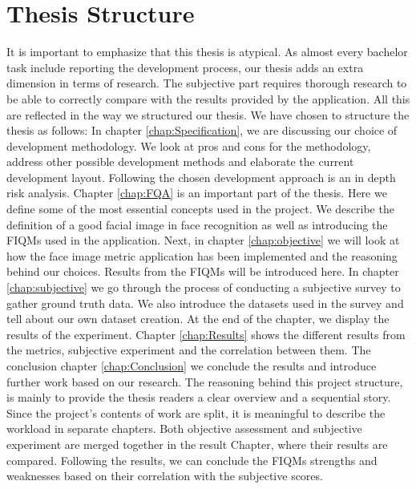 \section{Thesis Structure}
It is important to emphasize that this thesis is atypical. As almost every bachelor task include reporting the development process, our thesis adds an extra dimension in terms of research. The subjective part requires thorough research to be able to correctly compare with the results provided by the application. All this are reflected in the way we structured our thesis. 
We have chosen to structure the thesis as follows: In chapter \ref{chap:Specification}, we are discussing our choice of development methodology. We look at pros and cons for the methodology, address other possible development methods and elaborate the current development layout. Following the chosen development approach is an in depth risk analysis. Chapter \ref{chap:FQA} is an important part of the thesis. Here we define some of the most essential concepts used in the project. We describe the definition of a good facial image in face recognition as well as introducing the FIQMs used in the application. Next, in chapter \ref{chap:objective} we will look at how the face image metric application has been implemented and the reasoning behind our choices. Results from the FIQMs will be introduced here. In chapter \ref{chap:subjective} we go through the process of conducting a subjective survey to gather ground truth data. We also introduce the datasets used in the survey and tell about our own dataset creation. At the end of the chapter, we display the results of the experiment. 
Chapter \ref{chap:Results} shows the different results from the metrics, subjective experiment and the correlation between them. The conclusion chapter \ref{chap:Conclusion} we conclude the results and introduce further work based on our research. 
The reasoning behind this project structure, is mainly to provide the thesis readers a clear overview and a sequential story. Since the project's contents of work are split, it is meaningful to describe the workload in separate chapters. Both objective assessment and subjective experiment are merged together in the result Chapter, where their results are compared. Following the results, we can conclude the FIQMs strengths and weaknesses based on their correlation with the subjective scores.   
